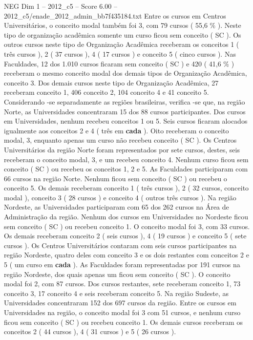 \begin{textsample}{NEG Dim 1 – 2012\_c5 – Score 6.00 – 2012\_c5/enade\_2012\_admin\_bb7f435184.txt}
Entre os cursos em Centros Universitários, o conceito modal também foi 3, com 79 cursos ( 55,6 \% ).
Neste tipo de organização acadêmica somente um curso ficou sem conceito ( SC ).
Os outros cursos neste tipo de Organização Acadêmica receberam os conceitos 1 ( três cursos ), 2 ( 37 cursos ), 4 ( 17 cursos ) e conceito 5 ( cinco cursos ).
Nas Faculdades, 12 dos 1.010 cursos ficaram sem conceito ( SC ) e 420 ( 41,6 \% ) receberam o mesmo conceito modal dos demais tipos de Organização Acadêmica, conceito 3.
Dos demais cursos neste tipo de Organização Acadêmica, 27 receberam conceito 1, 406 conceito 2, 104 conceito 4 e 41 conceito 5.
Considerando -se separadamente as regiões brasileiras, verifica -se que, na região Norte, as Universidades concentraram 15 dos 88 cursos participantes.
Dos cursos em Universidades, nenhum recebeu conceitos 1 ou 5.
Seis cursos ficaram alocados igualmente aos conceitos 2 e 4 ( três em \textbf{cada} ).
Oito receberam o conceito modal, 3, enquanto apenas um curso não recebeu conceito ( SC ).
Os Centros Universitários da região Norte foram representados por sete cursos, destes, seis receberam o conceito modal, 3, e um recebeu conceito 4.
Nenhum curso ficou sem conceito ( SC ) ou recebeu os conceitos 1, 2 e 5.
As Faculdades participaram com 66 cursos na região Norte.
Nenhum ficou sem conceito ( SC ) ou recebeu o conceito 5.
Os demais receberam conceito 1 ( três cursos ), 2 ( 32 cursos, conceito modal ), conceito 3 ( 28 cursos ) e conceito 4 ( outros três cursos ).
Na região Nordeste, as Universidades participaram com 65 dos 262 cursos na Área de Administração da região.
Nenhum dos cursos em Universidades no Nordeste ficou sem conceito ( SC ) ou recebeu conceito 1.
O conceito modal foi 3, com 33 cursos.
Os demais receberam conceito 2 ( seis cursos ), 4 ( 19 cursos ) e conceito 5 ( sete cursos ).
Os Centros Universitários contaram com seis cursos participantes na região Nordeste, quatro deles com conceito 3 e os dois restantes com conceitos 2 e 5 ( um curso em \textbf{cada} ).
As Faculdades foram representadas por 191 cursos na região Nordeste, dos quais apenas um ficou sem conceito ( SC ).
O conceito modal foi 2, com 87 cursos.
Dos cursos restantes, sete receberam conceito 1, 73 conceito 3, 17 conceito 4 e seis receberam conceito 5.
Na região Sudeste, as Universidades concentraram 152 dos 697 cursos da região.
Entre os cursos em Universidades na região, o conceito modal foi 3 com 51 cursos, e nenhum curso ficou sem conceito ( SC ) ou recebeu conceito 1.
Os demais cursos receberam os conceitos 2 ( 44 cursos ), 4 ( 31 cursos ) e 5 ( 26 cursos ).

\end{textsample}
